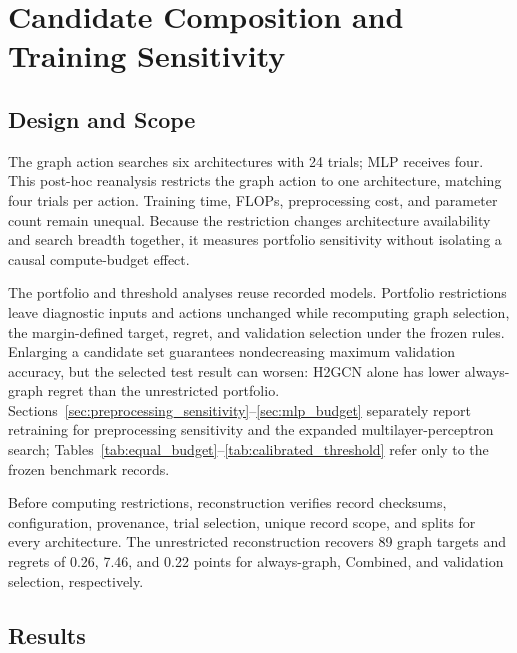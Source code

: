 \section{Candidate Composition and Training Sensitivity}
\label{sec:equal_budget}

\subsection{Design and Scope}

The graph action searches six architectures with 24 trials; MLP receives four. This post-hoc reanalysis restricts the graph action to one architecture, matching four trials per action. Training time, FLOPs, preprocessing cost, and parameter count remain unequal. Because the restriction changes architecture availability and search breadth together, it measures portfolio sensitivity without isolating a causal compute-budget effect.

The portfolio and threshold analyses reuse recorded models. Portfolio restrictions leave diagnostic inputs and actions unchanged while recomputing graph selection, the margin-defined target, regret, and validation selection under the frozen rules. Enlarging a candidate set guarantees nondecreasing maximum validation accuracy, but the selected test result can worsen: H2GCN alone has lower always-graph regret than the unrestricted portfolio. Sections~\ref{sec:preprocessing_sensitivity}--\ref{sec:mlp_budget} separately report retraining for preprocessing sensitivity and the expanded multilayer-perceptron search; Tables~\ref{tab:equal_budget}--\ref{tab:calibrated_threshold} refer only to the frozen benchmark records.

Before computing restrictions, reconstruction verifies record checksums, configuration, provenance, trial selection, unique record scope, and splits for every architecture. The unrestricted reconstruction recovers 89 graph targets and regrets of 0.26, 7.46, and 0.22 points for always-graph, Combined, and validation selection, respectively.

\subsection{Results}


